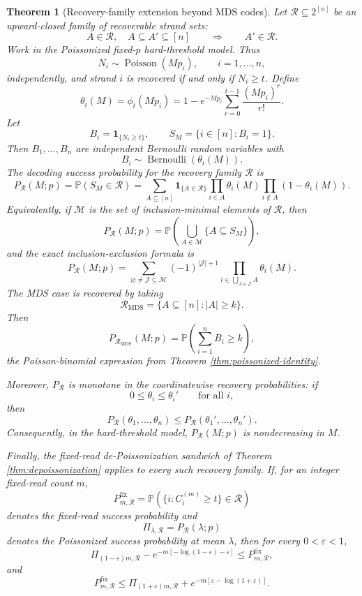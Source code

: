 \documentclass[11pt]{article}
\newtheorem{theorem}{Theorem}
\theoremstyle{definition}
\theoremstyle{remark}
\DeclareMathOperator{\Poisson}{Poisson}
\DeclareMathOperator{\Bernoulli}{Bernoulli}
\newcommand{\Pbb}{\mathbb P}
\newcommand{\1}{\mathbf 1}
\begin{document}
\begin{theorem}[Recovery-family extension beyond MDS codes]\label{thm:recovery-family}
Let \(\mathcal R\subseteq 2^{[n]}\) be an upward-closed family of recoverable strand sets:
\[
  A\in\mathcal R,\quad A\subseteq A'\subseteq[n]
  \qquad\Longrightarrow\qquad A'\in\mathcal R.
\]
Work in the Poissonized fixed-\(p\) hard-threshold model.  Thus
\[
  N_i\sim\Poisson(Mp_i),\qquad i=1,\ldots,n,
\]
independently, and strand \(i\) is recovered if and only if \(N_i\ge t\).  Define
\[
  \theta_i(M)=\phi_t(Mp_i)
  =1-e^{-Mp_i}\sum_{r=0}^{t-1}\frac{(Mp_i)^r}{r!}.
\]
Let
\[
  B_i=\1_{\{N_i\ge t\}},
  \qquad
  S_M=\{i\in[n]:B_i=1\}.
\]
Then \(B_1,\ldots,B_n\) are independent Bernoulli random variables with
\[
  B_i\sim\Bernoulli(\theta_i(M)).
\]
The decoding success probability for the recovery family \(\mathcal R\) is
\[
  P_{\mathcal R}(M;p)
  =\Pbb(S_M\in\mathcal R)
  =\sum_{A\subseteq[n]}\1_{\{A\in\mathcal R\}}
    \prod_{i\in A}\theta_i(M)
    \prod_{i\notin A}(1-\theta_i(M)).
\]
Equivalently, if \(\mathcal M\) is the set of inclusion-minimal elements of \(\mathcal R\), then
\[
  P_{\mathcal R}(M;p)
  =\Pbb\left(\bigcup_{A\in\mathcal M}\{A\subseteq S_M\}\right),
\]
and the exact inclusion-exclusion formula is
\[
  P_{\mathcal R}(M;p)
  =\sum_{\varnothing\ne \mathcal J\subseteq\mathcal M}
    (-1)^{|\mathcal J|+1}
    \prod_{i\in\bigcup_{A\in\mathcal J}A}\theta_i(M).
\]
The MDS case is recovered by taking
\[
  \mathcal R_{\mathrm{MDS}}=\{A\subseteq[n]: |A|\ge k\}.
\]
Then
\[
  P_{\mathcal R_{\mathrm{MDS}}}(M;p)
  =\Pbb\left(\sum_{i=1}^n B_i\ge k\right),
\]
the Poisson-binomial expression from Theorem \ref{thm:poissonized-identity}.

Moreover, \(P_{\mathcal R}\) is monotone in the coordinatewise recovery probabilities: if
\[
  0\le \theta_i\le\theta_i'\qquad\text{for all }i,
\]
then
\[
  P_{\mathcal R}(\theta_1,\ldots,\theta_n)
  \le
  P_{\mathcal R}(\theta_1',\ldots,\theta_n').
\]
Consequently, in the hard-threshold model, \(P_{\mathcal R}(M;p)\) is nondecreasing in \(M\).

Finally, the fixed-read de-Poissonization sandwich of Theorem \ref{thm:depoissonization} applies to every such recovery family.  If, for an integer fixed-read count \(m\),
\[
  P_{m,\mathcal R}^{\mathrm{fix}}
  =\Pbb(\{i:C_i^{(m)}\ge t\}\in\mathcal R)
\]
denotes the fixed-read success probability and
\[
  \Pi_{\lambda,\mathcal R}=P_{\mathcal R}(\lambda;p)
\]
denotes the Poissonized success probability at mean \(\lambda\), then for every \(0<\varepsilon<1\),
\[
  \Pi_{(1-\varepsilon)m,\mathcal R}
  -e^{-m[-\log(1-\varepsilon)-\varepsilon]}
  \le
  P_{m,\mathcal R}^{\mathrm{fix}},
\]
and
\[
  P_{m,\mathcal R}^{\mathrm{fix}}
  \le
  \Pi_{(1+\varepsilon)m,\mathcal R}
  +e^{-m[\varepsilon-\log(1+\varepsilon)]}.
\]
\end{theorem}
\end{document}
